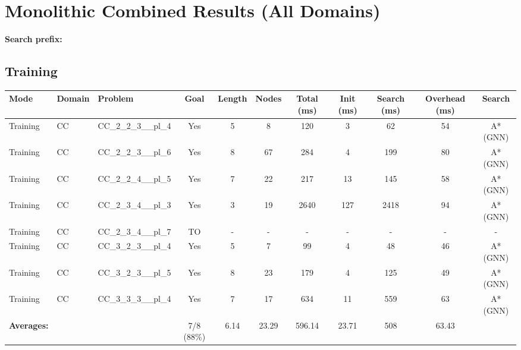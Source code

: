 \documentclass{article}
\begin{document}
\section*{Monolithic Combined Results (All Domains)}
\textbf{Search prefix:} 
\\[0.5cm]
\subsection*{Training}
\begin{tabular}{lllcccccccc}
\toprule
Mode & Domain & Problem & Goal & Length & Nodes & Total (ms) & Init (ms) & Search (ms) & Overhead (ms) & Search \\
\midrule
Training & CC & CC\_2\_2\_3\_\_pl\_4 & Yes & 5 & 8 & 120 & 3 & 62 & 54 & A*(GNN) \\
Training & CC & CC\_2\_2\_3\_\_pl\_6 & Yes & 8 & 67 & 284 & 4 & 199 & 80 & A*(GNN) \\
Training & CC & CC\_2\_2\_4\_\_pl\_5 & Yes & 7 & 22 & 217 & 13 & 145 & 58 & A*(GNN) \\
Training & CC & CC\_2\_3\_4\_\_pl\_3 & Yes & 3 & 19 & 2640 & 127 & 2418 & 94 & A*(GNN) \\
Training & CC & CC\_2\_3\_4\_\_pl\_7 & TO & - & - & - & - & - & - & - \\
Training & CC & CC\_3\_2\_3\_\_pl\_4 & Yes & 5 & 7 & 99 & 4 & 48 & 46 & A*(GNN) \\
Training & CC & CC\_3\_2\_3\_\_pl\_5 & Yes & 8 & 23 & 179 & 4 & 125 & 49 & A*(GNN) \\
Training & CC & CC\_3\_3\_3\_\_pl\_4 & Yes & 7 & 17 & 634 & 11 & 559 & 63 & A*(GNN) \\
\textbf{Averages:} & & & 7/8 (88\%) & 6.14 & 23.29 & 596.14 & 23.71 & 508 & 63.43 & \\
\bottomrule
\end{tabular}
\newpage
\end{document}

